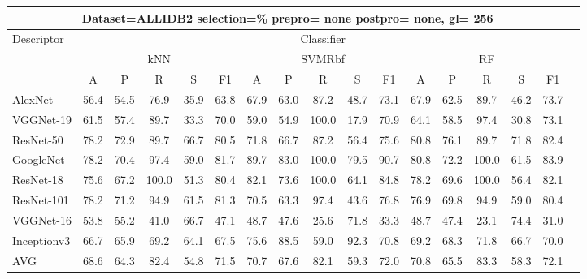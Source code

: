 \documentclass[12pt,italian]{article}
\begin{document}
\begin{tiny}
\begin{longtable}{lcccccccccccccccc}
\toprule
\multicolumn{16}{c}{Dataset=ALLIDB2 selection=\% prepro= none postpro= none, gl= 256} \\ 
\toprule
Descriptor & \multicolumn{15}{c}{Classifier} \\ 
& \multicolumn{5}{c}{kNN} & \multicolumn{5}{c}{SVMRbf} & \multicolumn{5}{c}{RF} \\ 
& A & P & R & S & F1 & A & P & R & S & F1 & A & P & R & S & F1 \\ 
\midrule
AlexNet & 56.4 & 54.5 & 76.9 & 35.9 & 63.8 & 67.9 & 63.0 & 87.2 & 48.7 & 73.1 & 67.9 & 62.5 & 89.7 & 46.2 & 73.7 \\ 
VGGNet-19 & 61.5 & 57.4 & 89.7 & 33.3 & 70.0 & 59.0 & 54.9 & 100.0 & 17.9 & 70.9 & 64.1 & 58.5 & 97.4 & 30.8 & 73.1 \\ 
ResNet-50 & 78.2 & 72.9 & 89.7 & 66.7 & 80.5 & 71.8 & 66.7 & 87.2 & 56.4 & 75.6 & 80.8 & 76.1 & 89.7 & 71.8 & 82.4 \\ 
GoogleNet & 78.2 & 70.4 & 97.4 & 59.0 & 81.7 & 89.7 & 83.0 & 100.0 & 79.5 & 90.7 & 80.8 & 72.2 & 100.0 & 61.5 & 83.9 \\ 
ResNet-18 & 75.6 & 67.2 & 100.0 & 51.3 & 80.4 & 82.1 & 73.6 & 100.0 & 64.1 & 84.8 & 78.2 & 69.6 & 100.0 & 56.4 & 82.1 \\ 
ResNet-101 & 78.2 & 71.2 & 94.9 & 61.5 & 81.3 & 70.5 & 63.3 & 97.4 & 43.6 & 76.8 & 76.9 & 69.8 & 94.9 & 59.0 & 80.4 \\ 
VGGNet-16 & 53.8 & 55.2 & 41.0 & 66.7 & 47.1 & 48.7 & 47.6 & 25.6 & 71.8 & 33.3 & 48.7 & 47.4 & 23.1 & 74.4 & 31.0 \\ 
Inceptionv3 & 66.7 & 65.9 & 69.2 & 64.1 & 67.5 & 75.6 & 88.5 & 59.0 & 92.3 & 70.8 & 69.2 & 68.3 & 71.8 & 66.7 & 70.0 \\ 
\hline
AVG & 68.6 & 64.3 & 82.4 & 54.8 & 71.5 & 70.7 & 67.6 & 82.1 & 59.3 & 72.0 & 70.8 & 65.5 & 83.3 & 58.3 & 72.1 \\ 
\hline
\bottomrule
\end{longtable} 

 \pagebreak 
\end{tiny} 
 
\end{document}
